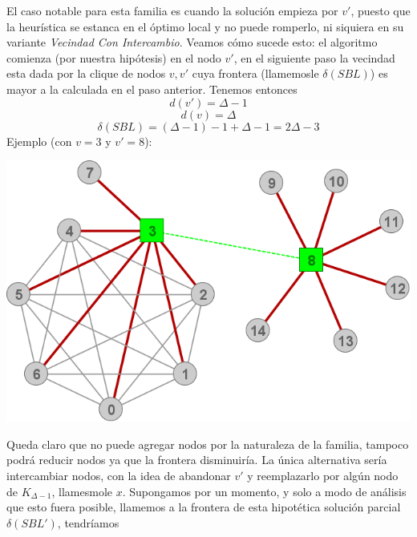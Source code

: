 El caso notable para esta familia es cuando la soluci\'on empieza por $v'$, puesto 
que la heur\'istica se estanca en el \'optimo local y no puede romperlo, ni siquiera
en su variante \emph{Vecindad Con Intercambio}. Veamos c\'omo sucede esto: el 
algoritmo comienza (por nuestra hip\'otesis) en el nodo $v'$, en el siguiente paso
la vecindad esta dada por la clique de nodos $v, v'$ cuya frontera (llamemosle 
$\delta(SBL)$) es mayor a la calculada en el paso anterior. Tenemos entonces
\[ d(v') = \Delta -1 \]
\[ d(v) = \Delta \]
\[ \delta(SBL) = (\Delta -1) -1 + \Delta -1 = 2 \Delta -3 \]
Ejemplo (con $v=3$ y $v'=8$):
\begin{center}
	\includegraphics[scale = 0.3]{img/ej3/busqueda_local/estrellaCMF_st02.png} \\
\end{center}

Queda claro que no puede agregar nodos por la naturaleza de la familia, 
tampoco podr\'a reducir nodos ya que la frontera disminuir\'ia. La \'unica
alternativa ser\'ia intercambiar nodos, con la idea de abandonar $v'$ y 
reemplazarlo por alg\'un nodo de $K_{\Delta -1}$, llamesmole $x$. 
Supongamos por un momento, 
y solo a modo de an\'alisis que esto fuera posible, llamemos a la frontera
de esta hipot\'etica soluci\'on parcial $\delta(SBL')$, tendr\'iamos

